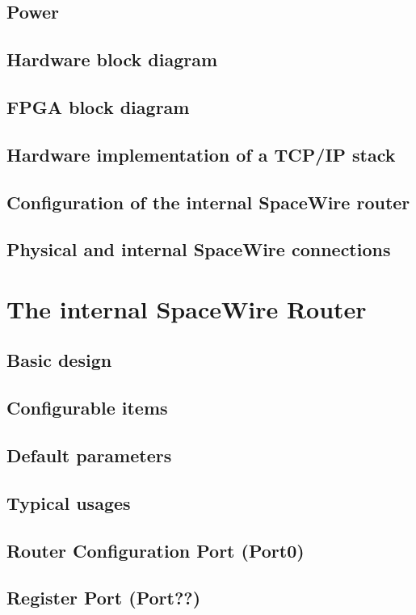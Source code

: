 \documentclass[a4paper,10pt]{article}
\begin{document}
\subsection{Power}

\subsection{Hardware block diagram}
\subsection{FPGA block diagram}
\subsection{Hardware implementation of a TCP/IP stack}
\subsection{Configuration of the internal SpaceWire router}
\subsection{Physical and internal SpaceWire connections}

\section{The internal SpaceWire Router}
\subsection{Basic design}
\subsection{Configurable items}
\subsection{Default parameters}
\subsection{Typical usages}
\subsection{Router Configuration Port (Port0)}
\subsection{Register Port (Port??)}
\end{document}
